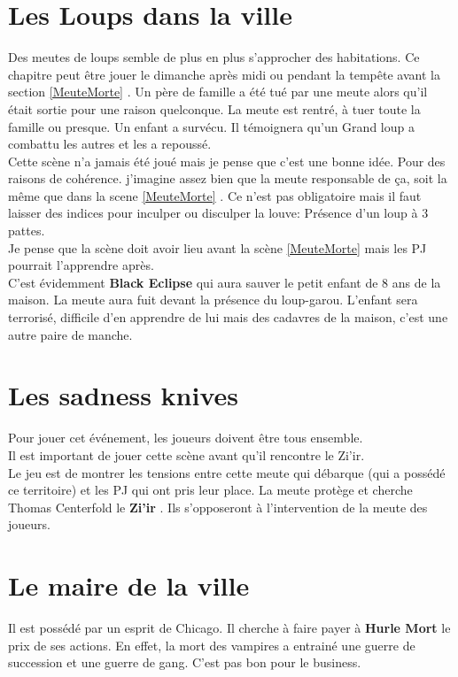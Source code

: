 \documentclass[oneside,12pt]{book}
\newcommand{\Peter}{\textbf{Hurle Mort} }
\newcommand{\BlackEclipse}{\textbf{Black Eclipse} }
\newcommand{\Thomas}{\textbf{Zi'ir} }
\begin{document}
\begin{flushleft}
\section{Les Loups dans la ville}
Des meutes de loups semble de plus en plus s'approcher des habitations. Ce chapitre peut être jouer le dimanche après midi ou pendant la tempête avant la section \ref{MeuteMorte} .
Un père de famille a été tué par une meute alors qu'il était sortie pour une raison quelconque. 
La meute est rentré, à tuer toute la famille ou presque. Un enfant a survécu. Il témoignera qu'un Grand loup a combattu les autres et les a repoussé.\\
Cette scène n'a jamais été joué mais je pense que c'est une bonne idée. Pour des raisons de cohérence. j'imagine assez bien que la meute responsable de ça, soit la même que dans la scene \ref{MeuteMorte} . Ce n'est pas obligatoire mais il faut laisser des indices pour inculper ou disculper la louve: Présence d'un loup à 3 pattes. \\ 
Je pense que la scène doit avoir lieu avant la scène \ref{MeuteMorte} mais les PJ pourrait l'apprendre après.  \\
C'est évidemment \BlackEclipse qui aura sauver le petit enfant de 8 ans de la maison. La meute aura fuit devant la présence du loup-garou. L'enfant sera terrorisé, difficile d'en apprendre de lui mais des cadavres de la maison, c'est une autre paire de manche. 

\section{Les sadness knives}
\label{sadness}
Pour jouer cet événement, les joueurs doivent être tous ensemble.\\
Il est important de jouer cette scène avant qu'il rencontre le Zi'ir.\\ 
Le jeu est de montrer les tensions entre cette meute qui débarque (qui a possédé ce territoire) et les PJ qui ont pris leur place.
La meute protège et cherche Thomas Centerfold le \Thomas . Ils s'opposeront à l'intervention de la meute des joueurs.


\section{Le maire de la ville}
\label{le_maire}
Il est possédé par un esprit de Chicago. Il cherche à faire payer à \Peter le prix de ses actions. En effet, la mort des vampires a entrainé une guerre de succession et une guerre de gang. C'est pas bon pour le business. 




\end{flushleft}
\end{document}
